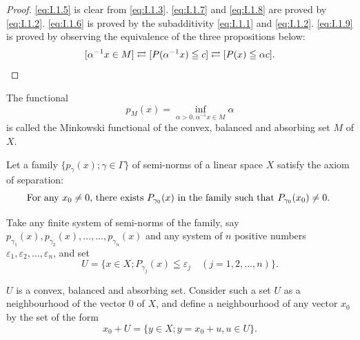 \begin{proof}
 \eqref{eq:I.1.5} is clear from \eqref{eq:I.1.3}. \eqref{eq:I.1.7} and \eqref{eq:I.1.8} are proved by \eqref{eq:I.1.2}. \eqref{eq:I.1.6} is proved by the subadditivity \eqref{eq:I.1.1} and \eqref{eq:I.1.2}. \eqref{eq:I.1.9} is proved by observing the equivalence of the three propositions below: 
\[
[ \alpha^{-1} x \in M ] \rightleftarrows [ P(\alpha^{-1} x) \leqq c ] \rightleftarrows [ P(x) \leqq \alpha c ]. \qedhere\]
\end{proof}

\begin{definition}\label{def:I.1.Definition.2} The functional 
\begin{equation}\tag{9'}\label{eq:I.1.9'}
p_{M} (x) = \inf\limits_ {\alpha > 0, \alpha^{-1} x \in M} \alpha
\end{equation}
is called the Minkowski functional of the convex, balanced and absorbing set $M$ of $X$. 
\end{definition}

\begin{proposition}\label{prop:I.1.Proposition.3} Let a family $\{p_{\gamma}(x); \gamma \in \Gamma\}$ of semi-norms of a linear space $X$ satisfy the axiom of separation: 
\begin{equation}
\label{eq:I.1.10}
\begin{minipage}{0.92\linewidth}
\everymath{}\let\limits\nolimits
For any $x_0\neq0,$ there exists $P_{\gamma_0}(x)$ in the family such that $P_{\gamma_0}(x_0)\neq0.$
\end{minipage}
\end{equation}
\end{proposition}

Take any finite system of semi-norms of the family, say $p_{\gamma_1}(x), p_{\gamma_2}(x), \ldots, \ldots, p_{\gamma_n}(x)$ and any system of $n$ positive numbers $\varepsilon_1, \varepsilon_2, \ldots, \varepsilon_n$, and set 
\begin{equation}\label{eq:I.1.11}
U = \{x \in X; P_ {\gamma_{j}} (x) \leqq \varepsilon_{j} \quad (j = 1, 2, \dots , n) \}.
\end{equation}

$U$ is a convex, balanced and absorbing set. Consider such a set $U$ as a neighbourhood of the vector $0$ of $X$, and define a neighbourhood of any vector $x_{0}$ by the set of the form 
\begin{equation}\label{eq:I.1.12}
x_{0} + U = \{y \in X; y = x_{0} + u, u \in U \}.
\end{equation}

